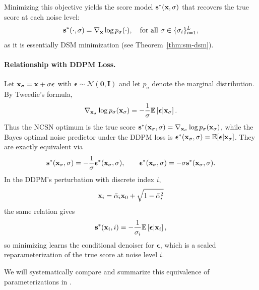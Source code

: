 Minimizing this objective yields the score model ${\mathbf{s}}^*({\mathbf{x}}, \sigma)$ that recovers the true score at each noise level:
\[
{\mathbf{s}}^*(\cdot, \sigma) = \nabla_{{\mathbf{x}}} \log p_\sigma(\cdot),  \quad \text{for all } \sigma \in \{\sigma_i\}_{i=1}^L,
\]
as it is essentially DSM minimization (see Theorem~\ref{thm:sm-dsm}).


\paragraph{Relationship with DDPM Loss.}
Let ${\mathbf{x}}_\sigma={\mathbf{x}}+\sigma\boldsymbol{\epsilon}$ with $\boldsymbol{\epsilon}\sim\mathcal{N}(\mathbf{0},\mathbf{I})$ and let $p_\sigma$ denote the  marginal distribution. By Tweedie’s formula,
\[
\nabla_{{\mathbf{x}}_\sigma}\log p_\sigma({\mathbf{x}}_\sigma)
= -\frac{1}{\sigma} \mathbb{E} \left[\boldsymbol{\epsilon} \middle|  {\mathbf{x}}_\sigma\right].
\]
Thus the NCSN optimum is the true score ${\mathbf{s}}^*({\mathbf{x}}_\sigma,\sigma)=\nabla_{{\mathbf{x}}_\sigma}\log p_\sigma({\mathbf{x}}_\sigma)$, while the Bayes optimal noise predictor under the DDPM loss  is $\boldsymbol{\epsilon}^*({\mathbf{x}}_\sigma,\sigma)=\mathbb{E}[\boldsymbol{\epsilon}|{\mathbf{x}}_\sigma]$. They are exactly equivalent via
\[
{\mathbf{s}}^*({\mathbf{x}}_\sigma,\sigma) = - \frac{1}{\sigma} \boldsymbol{\epsilon}^*({\mathbf{x}}_\sigma,\sigma),
\qquad
\boldsymbol{\epsilon}^*({\mathbf{x}}_\sigma,\sigma) = - \sigma {\mathbf{s}}^*({\mathbf{x}}_\sigma,\sigma).
\]
In the DDPM's perturbation   with discrete index $i$,
\[
{\mathbf{x}}_i = \bar{\alpha}_i {\mathbf{x}}_0 + \sqrt{1 - \bar{\alpha}_i^2}
\]
the same relation gives
\[
{\mathbf{s}}^*({\mathbf{x}}_i,i)= -\frac{1}{\sigma_i} \mathbb{E} \left[\boldsymbol{\epsilon} \middle|  {\mathbf{x}}_i\right],
\]
so minimizing  learns the conditional  denoiser for $\boldsymbol{\epsilon}$, which is a scaled reparameterization of the true score at noise level $i$.

We will systematically compare and summarize this equivalence of parameterizations in .



